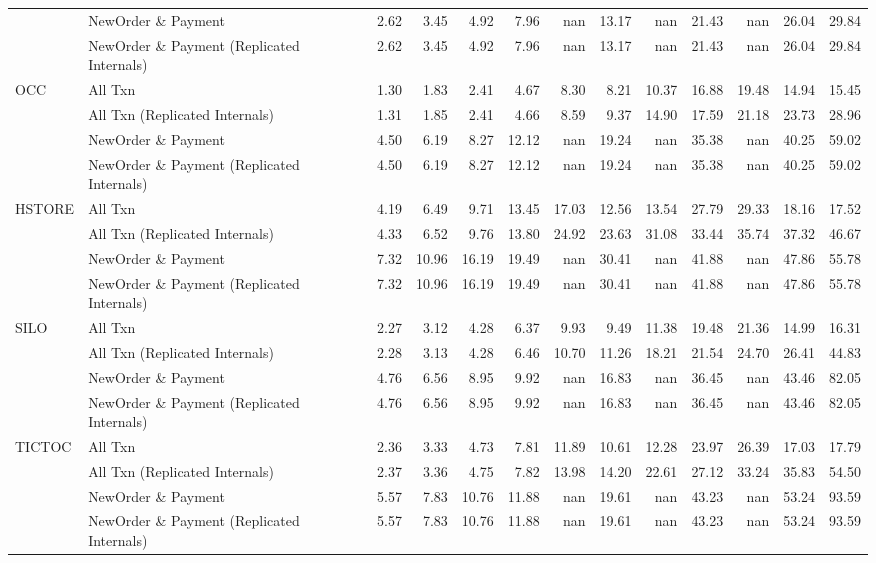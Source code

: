 \begin{tabular}{llrrrrrrrrrrr}
       & NewOrder \& Payment &  2.62 &  3.45 &  4.92 &  7.96 &   nan & 13.17 &   nan & 21.43 &   nan & 26.04 & 29.84 \\
       & NewOrder \& Payment (Replicated Internals) &  2.62 &  3.45 &  4.92 &  7.96 &   nan & 13.17 &   nan & 21.43 &   nan & 26.04 & 29.84 \\
OCC & All Txn &  1.30 &  1.83 &  2.41 &  4.67 &  8.30 &  8.21 & 10.37 & 16.88 & 19.48 & 14.94 & 15.45 \\
       & All Txn (Replicated Internals) &  1.31 &  1.85 &  2.41 &  4.66 &  8.59 &  9.37 & 14.90 & 17.59 & 21.18 & 23.73 & 28.96 \\
       & NewOrder \& Payment &  4.50 &  6.19 &  8.27 & 12.12 &   nan & 19.24 &   nan & 35.38 &   nan & 40.25 & 59.02 \\
       & NewOrder \& Payment (Replicated Internals) &  4.50 &  6.19 &  8.27 & 12.12 &   nan & 19.24 &   nan & 35.38 &   nan & 40.25 & 59.02 \\
HSTORE & All Txn &  4.19 &  6.49 &  9.71 & 13.45 & 17.03 & 12.56 & 13.54 & 27.79 & 29.33 & 18.16 & 17.52 \\
       & All Txn (Replicated Internals) &  4.33 &  6.52 &  9.76 & 13.80 & 24.92 & 23.63 & 31.08 & 33.44 & 35.74 & 37.32 & 46.67 \\
       & NewOrder \& Payment &  7.32 & 10.96 & 16.19 & 19.49 &   nan & 30.41 &   nan & 41.88 &   nan & 47.86 & 55.78 \\
       & NewOrder \& Payment (Replicated Internals) &  7.32 & 10.96 & 16.19 & 19.49 &   nan & 30.41 &   nan & 41.88 &   nan & 47.86 & 55.78 \\
SILO & All Txn &  2.27 &  3.12 &  4.28 &  6.37 &  9.93 &  9.49 & 11.38 & 19.48 & 21.36 & 14.99 & 16.31 \\
       & All Txn (Replicated Internals) &  2.28 &  3.13 &  4.28 &  6.46 & 10.70 & 11.26 & 18.21 & 21.54 & 24.70 & 26.41 & 44.83 \\
       & NewOrder \& Payment &  4.76 &  6.56 &  8.95 &  9.92 &   nan & 16.83 &   nan & 36.45 &   nan & 43.46 & 82.05 \\
       & NewOrder \& Payment (Replicated Internals) &  4.76 &  6.56 &  8.95 &  9.92 &   nan & 16.83 &   nan & 36.45 &   nan & 43.46 & 82.05 \\
TICTOC & All Txn &  2.36 &  3.33 &  4.73 &  7.81 & 11.89 & 10.61 & 12.28 & 23.97 & 26.39 & 17.03 & 17.79 \\
       & All Txn (Replicated Internals) &  2.37 &  3.36 &  4.75 &  7.82 & 13.98 & 14.20 & 22.61 & 27.12 & 33.24 & 35.83 & 54.50 \\
       & NewOrder \& Payment &  5.57 &  7.83 & 10.76 & 11.88 &   nan & 19.61 &   nan & 43.23 &   nan & 53.24 & 93.59 \\
       & NewOrder \& Payment (Replicated Internals) &  5.57 &  7.83 & 10.76 & 11.88 &   nan & 19.61 &   nan & 43.23 &   nan & 53.24 & 93.59 \\
\bottomrule
\end{tabular}
